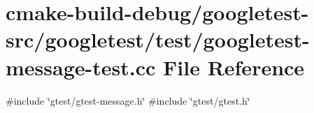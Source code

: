 \hypertarget{googletest-message-test_8cc}{}\section{cmake-\/build-\/debug/googletest-\/src/googletest/test/googletest-\/message-\/test.cc File Reference}
\label{googletest-message-test_8cc}
{\ttfamily \#include \char`\"{}gtest/gtest-\/message.\+h\char`\"{}}\newline
{\ttfamily \#include \char`\"{}gtest/gtest.\+h\char`\"{}}\newline
